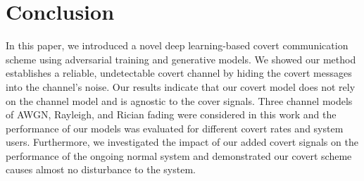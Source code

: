 \section{Conclusion}
\label{s:conc}
In this paper, we introduced a novel deep learning-based covert communication scheme using adversarial training and generative models. We showed our method establishes a reliable, undetectable covert channel by hiding the covert messages into the channel's noise. Our results indicate that our covert model does not rely on the channel model and is agnostic to the cover signals. Three channel models of AWGN, Rayleigh, and Rician fading were considered in this work and the performance of our models was evaluated for different covert rates and system users. Furthermore, we investigated the impact of our added covert signals on the performance of the ongoing normal system and demonstrated our covert scheme causes almost no disturbance to the system.
